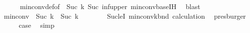 \begin{isabellebody}
\ \ \ \ \isamarkupfalse%
\ min{\isacharunderscore}{\kern0pt}conv{\isacharunderscore}{\kern0pt}def{\isacharbrackleft}{\kern0pt}of\ {\isachardoublequoteopen}{}{\isachardoublequoteclose}\ {\isachardoublequoteopen}Suc\ k{\isachardoublequoteclose}{\isacharbrackright}{\kern0pt}\ Suc\ inf{\isacharunderscore}{\kern0pt}upper\ min{\isacharunderscore}{\kern0pt}conv{\isacharunderscore}{\kern0pt}base{\isacharunderscore}{\kern0pt}IH\ \isamarkupfalse%
\ blast\isanewline
\ \ \isamarkupfalse%
\ \isamarkupfalse%
\ {\isachardoublequoteopen}min{\isacharunderscore}{\kern0pt}conv\ {}\ {\isacharparenleft}{\kern0pt}Suc\ k{\isacharparenright}{\kern0pt}\ {\isasymge}\ Suc\ k{\isachardoublequoteclose}\ \ \isanewline
\ \ \ \ \isamarkupfalse%
\ Suc{\isacharunderscore}{\kern0pt}leI\ min{\isacharunderscore}{\kern0pt}conv{\isacharunderscore}{\kern0pt}{}{\isacharunderscore}{\kern0pt}k{\isacharunderscore}{\kern0pt}bnd\ calculation\ \isamarkupfalse%
\ presburger\isanewline
\ \ \isamarkupfalse%
\ \isamarkupfalse%
\ {\isacharquery}{\kern0pt}case\ \isamarkupfalse%
\ simp\isanewline
{}\isamarkupfalse%
%
\endisatagproof
{\isafoldproof}%
%
\isadelimproof
\isanewline
%
\endisadelimproof
\isanewline
%
\isadelimtheory
\isanewline
%
\endisadelimtheory
%
\isatagtheory
{}\isamarkupfalse%
%
\endisatagtheory
{\isafoldtheory}%
%
\isadelimtheory
%
\endisadelimtheory
%
\end{isabellebody}%
\endinput
